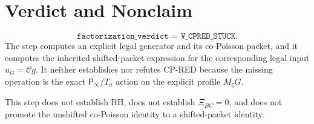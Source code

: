 \documentclass[11pt]{article}
\newcommand{\Chat}{\mathcal C}
\newcommand{\Pinfm}{\mathsf P_\infty}
\begin{document}
\section{Verdict and Nonclaim}
\[
  \boxed{\texttt{factorization\_verdict = V\_CPRED\_STUCK}.}
\]
The step computes an explicit legal generator and its co-Poisson packet, and it
computes the inherited shifted-packet expression for the corresponding legal
input \(u_G=\Chat g\).  It neither establishes nor refutes CP-RED because the
missing operation is the exact \(\Pinfm/T_a\) action on the explicit profile
\(M_\zeta G\).

This step does not establish RH, does not establish \(\Xi_{BC}=0\), and does
not promote the unshifted co-Poisson identity to a shifted-packet identity.
\end{document}
